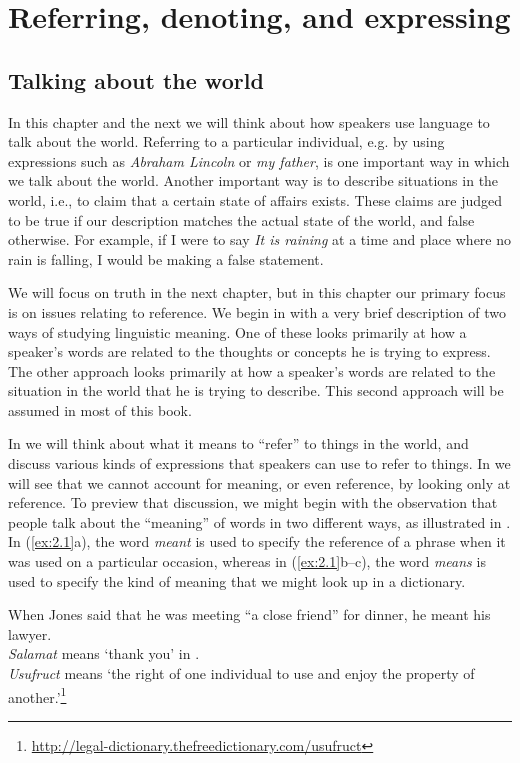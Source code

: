\chapter{Referring, denoting, and expressing}\label{sec:2}

\section{Talking about the world}\label{sec:2.1}
\largerpage[2]
In this chapter and the next we will think about how speakers use language to talk about the world. Referring to a particular individual, e.g. by using expressions such as \textit{Abraham Lincoln} or \textit{my father}, is one important way in which we talk about the world. Another important way is to describe situations in the world, i.e., to claim that a certain state of affairs exists. These claims are judged to be true if our description matches the actual state of the world, and false otherwise. For example, if I were to say \textit{It is raining} at a time and place where no rain is falling, I would be making a false statement.

We will focus on truth in the next chapter, but in this chapter our primary focus is on issues relating to reference. We begin in  with a very brief description of two ways of studying linguistic meaning. One of these looks primarily at how a speaker’s words are related to the thoughts or concepts he is trying to express. The other approach looks primarily at how a speaker’s words are related to the situation in the world that he is trying to describe. This second approach will be assumed in most of this book.

In  we will think about what it means to “refer” to things in the world, and discuss various kinds of expressions that speakers can use to refer to things. In  we will see that we cannot account for meaning, or even reference, by looking only at reference. To preview that discussion, we might begin with the observation that people talk about the “meaning” of words in two different ways, as illustrated in . In (\ref{ex:2.1}a), the word \textit{meant} is used to specify the reference of a phrase when it was used on a particular occasion, whereas in (\ref{ex:2.1}b--c), the word \textit{means} is used to specify the kind of meaning that we might look up in a dictionary.


\ea \label{ex:2.1}
\ea When Jones said that he was meeting “a close friend” for dinner, he meant his lawyer.\\
\ex \textit{Salamat} means ‘thank you’ in .\\
\ex \textit{Usufruct} means ‘the right of one individual to use and enjoy the property of another.’\footnote{\url{http://legal-dictionary.thefreedictionary.com/usufruct}}
\z
\z


